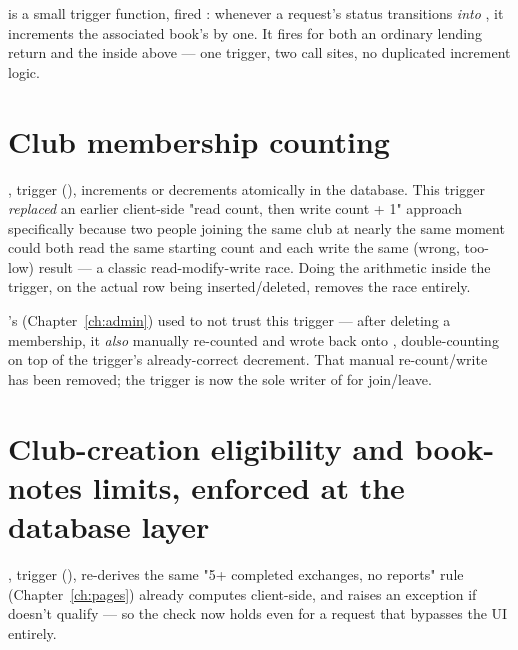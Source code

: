  is a small trigger function, fired : whenever a request's status transitions \emph{into} , it increments the associated book's  by one. It fires for both an ordinary lending return and the  inside  above — one trigger, two call sites, no duplicated increment logic.

\section{Club membership counting}

, trigger  (), increments or decrements  atomically in the database. This trigger \emph{replaced} an earlier client-side "read count, then write count + 1" approach specifically because two people joining the same club at nearly the same moment could both read the same starting count and each write the same (wrong, too-low) result — a classic read-modify-write race. Doing the arithmetic inside the trigger, on the actual row being inserted/deleted, removes the race entirely.

\begin{olknote}
's  (Chapter~\ref{ch:admin}) used to not trust this trigger — after deleting a membership, it \emph{also} manually re-counted  and wrote  back onto , double-counting on top of the trigger's already-correct decrement. That manual re-count/write has been removed; the trigger is now the sole writer of  for join/leave.
\end{olknote}

\section{Club-creation eligibility and book-notes limits, enforced at the database layer}

, trigger  (), re-derives the same "5+ completed exchanges, no reports" rule  (Chapter~\ref{ch:pages}) already computes client-side, and raises an exception if  doesn't qualify — so the check now holds even for a request that bypasses the UI entirely.

